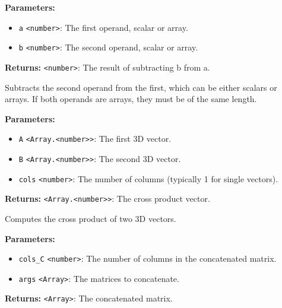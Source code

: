 \documentclass[12pt,a4paper]{article}
\begin{document}
\noindent \textbf{Parameters:}
\begin{itemize}
  \item \texttt{a} \texttt{<number>}: The first operand, scalar or array.
  \item \texttt{b} \texttt{<number>}: The second operand, scalar or array.
\end{itemize}

\noindent \textbf{Returns:} \texttt{<number>}: The result of subtracting \textasciigrave{}b\textasciigrave{} from \textasciigrave{}a\textasciigrave{}.

\noindent Subtracts the second operand from the first, which can be either scalars or arrays.
If both operands are arrays, they must be of the same length.

\vspace{5mm}
\noindent {}


\noindent \textbf{Parameters:}
\begin{itemize}
  \item \texttt{A} \texttt{<Array.<number>>}: The first 3D vector.
  \item \texttt{B} \texttt{<Array.<number>>}: The second 3D vector.
  \item \texttt{cols} \texttt{<number>}: The number of columns (typically 1 for single vectors).
\end{itemize}

\noindent \textbf{Returns:} \texttt{<Array.<number>>}: The cross product vector.

\noindent Computes the cross product of two 3D vectors.

\vspace{5mm}
\noindent {}


\noindent \textbf{Parameters:}
\begin{itemize}
  \item \texttt{cols\_C} \texttt{<number>}: The number of columns in the concatenated matrix.
  \item \texttt{args} \texttt{<Array>}: The matrices to concatenate.
\end{itemize}

\noindent \textbf{Returns:} \texttt{<Array>}: The concatenated matrix.
\end{document}
